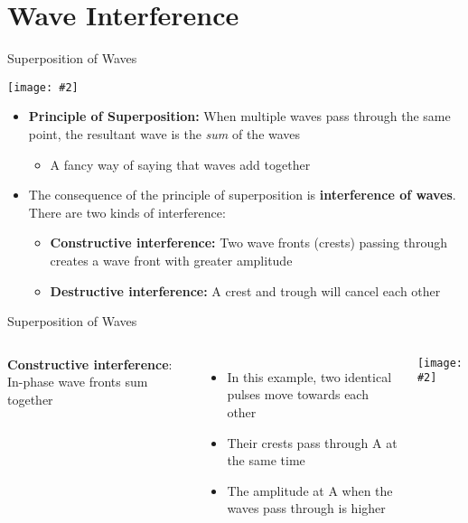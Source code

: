 \documentclass[12pt,aspectratio=169]{beamer}
\newcommand{\pic}[2]{\texttt{[image: \#2]}}
\begin{document}
\section[Interference]{Wave Interference}

\begin{frame}{Superposition of Waves}
  \begin{center}
    \pic{.6}{omkAt}
  \end{center}
  \begin{itemize}
  \item\textbf{Principle of Superposition:} When multiple waves pass through
    the same point, the resultant wave is the \emph{sum} of the waves
    \begin{itemize}
    \item A fancy way of saying that waves add together
    \end{itemize}
  \item The consequence of the principle of superposition is
    \textbf{interference of waves}. There are two kinds of interference:
    \begin{itemize}
    \item\textbf{Constructive interference:} Two wave fronts (crests) passing
      through creates a wave front with greater amplitude
    \item\textbf{Destructive interference:} A crest and trough will cancel
      each other
    \end{itemize}
  \end{itemize}
\end{frame}



\begin{frame}{Superposition of Waves}
  \begin{columns}
    \textbf{Constructive interference}: In-phase wave fronts sum together
    \begin{itemize}
    \item In this example, two identical pulses move towards each other
    \item Their crests pass through A at the same time
    \item The amplitude at A when the waves pass through is higher 
    \end{itemize}
    
    \pic1{constructive}
  \end{columns}
\end{frame}
\end{document}
